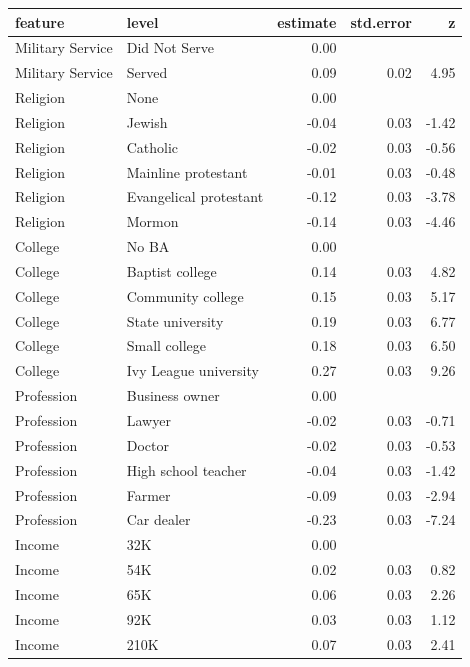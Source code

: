 \documentclass[a4paper,12pt]{article}\usepackage[]{graphicx}\usepackage[]{color}
\begin{document}
\clearpage

\begin{table}[ht]
\centering
\begingroup\footnotesize
\begin{tabular}{lp{3in}rrr}
  \hline
feature & level & estimate & std.error & z \\ 
  \hline
Military Service & Did Not Serve & 0.00 &  &  \\ 
  Military Service & Served & 0.09 & 0.02 & 4.95 \\ 
  Religion & None & 0.00 &  &  \\ 
  Religion & Jewish & -0.04 & 0.03 & -1.42 \\ 
  Religion & Catholic & -0.02 & 0.03 & -0.56 \\ 
  Religion & Mainline protestant & -0.01 & 0.03 & -0.48 \\ 
  Religion & Evangelical protestant & -0.12 & 0.03 & -3.78 \\ 
  Religion & Mormon & -0.14 & 0.03 & -4.46 \\ 
  College & No BA & 0.00 &  &  \\ 
  College & Baptist college & 0.14 & 0.03 & 4.82 \\ 
  College & Community college & 0.15 & 0.03 & 5.17 \\ 
  College & State university & 0.19 & 0.03 & 6.77 \\ 
  College & Small college & 0.18 & 0.03 & 6.50 \\ 
  College & Ivy League university & 0.27 & 0.03 & 9.26 \\ 
  Profession & Business owner & 0.00 &  &  \\ 
  Profession & Lawyer & -0.02 & 0.03 & -0.71 \\ 
  Profession & Doctor & -0.02 & 0.03 & -0.53 \\ 
  Profession & High school teacher & -0.04 & 0.03 & -1.42 \\ 
  Profession & Farmer & -0.09 & 0.03 & -2.94 \\ 
  Profession & Car dealer & -0.23 & 0.03 & -7.24 \\ 
  Income & 32K & 0.00 &  &  \\ 
  Income & 54K & 0.02 & 0.03 & 0.82 \\ 
  Income & 65K & 0.06 & 0.03 & 2.26 \\ 
  Income & 92K & 0.03 & 0.03 & 1.12 \\ 
  Income & 210K & 0.07 & 0.03 & 2.41 \\ 

\end{tabular}
\end{table}
\end{document}
